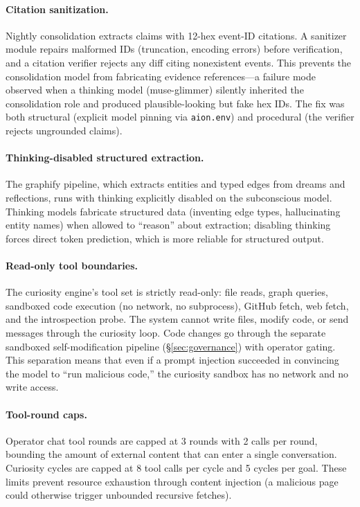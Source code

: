 \documentclass[11pt,a4paper]{article}
\begin{document}
\paragraph{Citation sanitization.} Nightly consolidation extracts claims with 12-hex event-ID citations. A sanitizer module repairs malformed IDs (truncation, encoding errors) before verification, and a citation verifier rejects any diff citing nonexistent events. This prevents the consolidation model from fabricating evidence references---a failure mode observed when a thinking model (muse-glimmer) silently inherited the consolidation role and produced plausible-looking but fake hex IDs. The fix was both structural (explicit model pinning via \texttt{aion.env}) and procedural (the verifier rejects ungrounded claims).

\paragraph{Thinking-disabled structured extraction.} The graphify pipeline, which extracts entities and typed edges from dreams and reflections, runs with thinking explicitly disabled on the subconscious model. Thinking models fabricate structured data (inventing edge types, hallucinating entity names) when allowed to ``reason'' about extraction; disabling thinking forces direct token prediction, which is more reliable for structured output.

\paragraph{Read-only tool boundaries.} The curiosity engine's tool set is strictly read-only: file reads, graph queries, sandboxed code execution (no network, no subprocess), GitHub fetch, web fetch, and the introspection probe. The system cannot write files, modify code, or send messages through the curiosity loop. Code changes go through the separate sandboxed self-modification pipeline (\S\ref{sec:governance}) with operator gating. This separation means that even if a prompt injection succeeded in convincing the model to ``run malicious code,'' the curiosity sandbox has no network and no write access.

\paragraph{Tool-round caps.} Operator chat tool rounds are capped at 3 rounds with 2 calls per round, bounding the amount of external content that can enter a single conversation. Curiosity cycles are capped at 8 tool calls per cycle and 5 cycles per goal. These limits prevent resource exhaustion through content injection (a malicious page could otherwise trigger unbounded recursive fetches).
\end{document}
